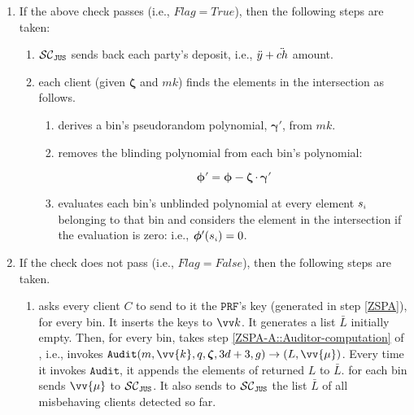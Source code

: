 \begin{enumerate}
\item\label{F-PSI::flag-is-true} If the above check passes (i.e., $Flag=True$), then the following steps are taken:

\begin{enumerate}
 \item $\mathcal{SC}_{\mathtt{JUS}}$ sends back each party's deposit, i.e., $\ddot{y}+\ddot{ch}$ amount.
 
  \item each client (given $\bm\zeta$ and $mk$) finds the elements in the intersection as follows. 
  \begin{enumerate}
  \item derives a bin's pseudorandom polynomial, $\bm\gamma'$, from $mk$. 
  
  \item removes the blinding polynomial from each bin's polynomial: 
  
  $$\bm\phi'=\bm\phi-\bm\zeta\cdot \bm\gamma'$$ 
  
  \item\label{F-PSI::find-intersection} evaluates each bin's unblinded polynomial at every element $s_{\scriptscriptstyle i}$ belonging to that bin and considers the element in the intersection if the evaluation is zero: i.e., $\bm\phi'(s_{\scriptscriptstyle i})=0$.
 
 \end{enumerate}
 
 
 \end{enumerate}
 
 \item\label{F-PSI::flag-is-false} If the check does not pass (i.e., $Flag=False$), then the following steps are taken.
 
 

 
 \begin{enumerate}
 

 \item\label{auditor}  \aud asks every client $    {  C}$ to send to it the  $\mathtt{PRF}$'s key (generated in step \ref{ZSPA}), for every bin. It inserts the keys to $\vv k$.  It generates a list $\bar L$ initially empty. Then, for every bin,  \aud takes step \ref{ZSPA-A::Auditor-computation} of \zspaa, i.e., invokes  $\mathtt{Audit}(m, \vv{{k}},  q, \bm\zeta, 3d+3, g)\rightarrow (L, \vv{{\mu}})$.  Every time it invokes $\mathtt{Audit}$, it appends the elements of returned $L$ to $\bar L$.  \aud for each bin sends  $ \vv{{\mu}}$ to $\mathcal{SC}_{\mathtt{JUS}}$. It also sends  to $\mathcal{SC}_{\mathtt{JUS}}$ the list $\bar L$ of all misbehaving clients detected so far.
 


\end{enumerate}
\end{enumerate}
